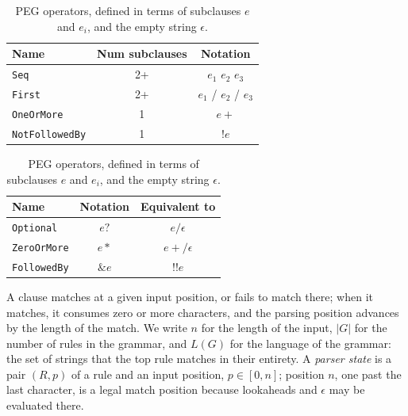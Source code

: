 \documentclass[manuscript]{acmart}
\newcommand{\cd}[1]{\texttt{#1}}
\begin{document}
\begin{table}[tbp]
    \centering
    {\small
    \begin{minipage}{0.45\textwidth}
        \centering
        \begin{tabular}{lcc}\toprule
        \textbf{Name}          & \textbf{Num subclauses} & \textbf{Notation}     \\\midrule
        \cd{Seq}           & 2+                      & $e_1$ $e_2$ $e_3$     \\
        \cd{First}         & 2+                      & $e_1$ / $e_2$ / $e_3$ \\
        \cd{OneOrMore}     & 1                       & $e+$                  \\
        \cd{NotFollowedBy} & 1                       & $!e$                  \\\bottomrule
        \end{tabular}
        \label{tab:peg_standard}
    \end{minipage}
    \hfill
    \begin{minipage}{0.45\textwidth}
        \centering
        \begin{tabular}{lcc}\toprule
        \textbf{Name}       & \textbf{Notation} & \textbf{Equivalent to} \\\midrule
        \cd{Optional}   & $e?$              & $e / \epsilon$         \\
        \cd{ZeroOrMore} & $e*$              & ${e+} / \epsilon$      \\
        \cd{FollowedBy} & $\&e$             & $!!e$                  \\\bottomrule
        \end{tabular}
        \label{tab:peg_derived}
    \end{minipage}
    }
    \caption{\label{tab:peg_operators}PEG operators, defined in terms of subclauses $e$ and $e_i$, and the empty string $\epsilon$.}
\end{table}

A clause matches at a given input position, or fails to match there; when it matches, it consumes zero or more characters, and the parsing position advances by the length of the match. We write $n$ for the length of the input, $|G|$ for the number of rules in the grammar, and $L(G)$ for the language of the grammar: the set of strings that the top rule matches in their entirety. A \emph{parser state} is a pair $(R, p)$ of a rule and an input position, $p \in [0, n]$; position $n$, one past the last character, is a legal match position because lookaheads and $\epsilon$ may be evaluated there.
\end{document}
